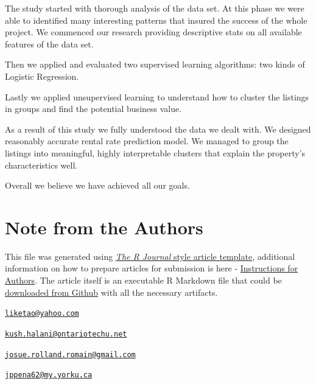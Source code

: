 The study started with thorough analysis of the data set. At this phase
we were able to identified many interesting patterns that insured the
success of the whole project. We commenced our research providing
descriptive stats on all available features of the data set.

Then we applied and evaluated two supervised learning algorithms: two
kinds of Logistic Regression.

Lastly we applied unsupervised learning to understand how to cluster the
listings in groups and find the potential business value.

As a result of this study we fully understood the data we dealt with. We
designed reasonably accurate rental rate prediction model. We managed to
group the listings into meaningful, highly interpretable clusters that
explain the property's characteristics well.

Overall we believe we have achieved all our goals.



\hypertarget{note-from-the-authors}{%
\section{Note from the Authors}\label{note-from-the-authors}}

This file was generated using
\href{https://github.com/rstudio/rticles}{\emph{The R Journal} style
article template}, additional information on how to prepare articles for
submission is here -
\href{https://journal.r-project.org/share/author-guide.pdf}{Instructions
for Authors}. The article itself is an executable R Markdown file that
could be
\href{https://github.com/ivbsoftware/big-data-final-2/blob/master/docs/R_Journal/big-data-final-2/}{downloaded
from Github} with all the necessary artifacts.


\address{%
Ketao Li\\
York University\\
\\
}
\href{mailto:liketao@yahoo.com}{\nolinkurl{liketao@yahoo.com}}

\address{%
Kush Halani\\
York University\\
\\
}
\href{mailto:kush.halani@ontariotechu.net}{\nolinkurl{kush.halani@ontariotechu.net}}

\address{%
Josue Romain\\
York University\\
\\
}
\href{mailto:josue.rolland.romain@gmail.com}{\nolinkurl{josue.rolland.romain@gmail.com}}

\address{%
Juan Peña\\
York University\\
\\
}
\href{mailto:jppena62@my.yorku.ca}{\nolinkurl{jppena62@my.yorku.ca}}

